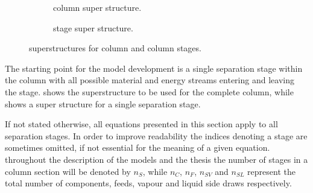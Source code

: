         \begin{figure}
            \centering
            \begin{subfigure}{0.3\textwidth}
                \centering
                
                \caption{column super structure.}
                \label{fig:col_super}
            \end{subfigure}
            \qquad
            \begin{subfigure}{0.6\textwidth}
                \centering
                
                \caption{stage super structure.}
                \label{fig:col_stage_super}
            \end{subfigure}
            \caption{superstructures for column and column stages.}
        \end{figure}

        The starting point for the model development is a single separation stage within the
        column with all possible material and energy streams entering and leaving the stage. 
        shows the superstructure to be used for the complete column, while  shows a super
        structure for a single separation stage.

        If not stated otherwise, all equations presented in this section apply to all separation stages. In order
        to improve readability the indices denoting a stage are sometimes omitted, if not essential for the meaning of
        a given equation. throughout the description of the models and the thesis the number of stages in a column section
        will be denoted by $n_S$, while $n_C$, $n_F$, $n_{SV}$ and $n_{SL}$ represent the total number of components,
        feeds, vapour and liquid side draws respectively.


